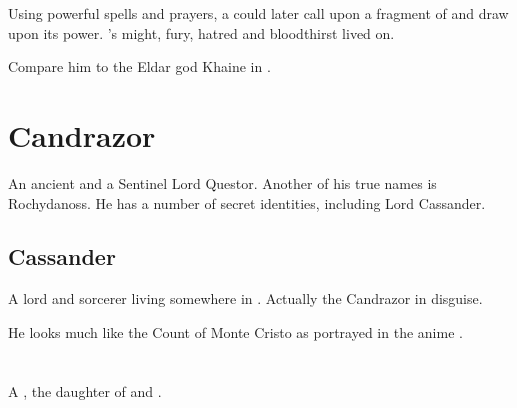 Using powerful spells and prayers, a \dragon could later call upon a fragment of \Nesthra and draw upon its power. 
\Nesthra's might, fury, hatred and bloodthirst lived on. 

Compare him to the Eldar god Khaine in \cite{RPG:Warhammer40000}. 















\section{Candrazor}
An ancient \dragon{} and a Sentinel Lord Questor. 
Another of his true names is Rochydanoss. 
He has a number of secret identities, including Lord Cassander. 










\subsection{Cassander}
A \human{} lord and sorcerer living somewhere in \Velcad{}. Actually the \dragon{} Candrazor in disguise. 

He looks much like the Count of Monte Cristo as portrayed in the anime \cite{Anime:Gankutsuou}. 















\section[Cryocas Nzessuacrith]{\CryocasNzessuacrith}
\index{\CryocasNzessuacrith}
\index{\Nzessuacrith}
A \dragon, the daughter of \QuessanthIshnaruchaefir and \AeocrithRystessakhin.









